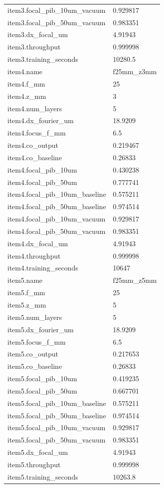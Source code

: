 \begin{longtable}{p{}p{}}
item3.focal\_pib\_10um\_vacuum & 0.929817\\
item3.focal\_pib\_50um\_vacuum & 0.983351\\
item3.dx\_focal\_um & 4.91943\\
item3.throughput & 0.999998\\
item3.training\_seconds & 10280.5\\
item4.name & f25mm\_z3mm\\
item4.f\_mm & 25\\
item4.z\_mm & 3\\
item4.num\_layers & 5\\
item4.dx\_fourier\_um & 18.9209\\
item4.focus\_f\_mm & 6.5\\
item4.co\_output & 0.219467\\
item4.co\_baseline & 0.26833\\
item4.focal\_pib\_10um & 0.430238\\
item4.focal\_pib\_50um & 0.777741\\
item4.focal\_pib\_10um\_baseline & 0.575211\\
item4.focal\_pib\_50um\_baseline & 0.974514\\
item4.focal\_pib\_10um\_vacuum & 0.929817\\
item4.focal\_pib\_50um\_vacuum & 0.983351\\
item4.dx\_focal\_um & 4.91943\\
item4.throughput & 0.999998\\
item4.training\_seconds & 10647\\
item5.name & f25mm\_z5mm\\
item5.f\_mm & 25\\
item5.z\_mm & 5\\
item5.num\_layers & 5\\
item5.dx\_fourier\_um & 18.9209\\
item5.focus\_f\_mm & 6.5\\
item5.co\_output & 0.217653\\
item5.co\_baseline & 0.26833\\
item5.focal\_pib\_10um & 0.419235\\
item5.focal\_pib\_50um & 0.667701\\
item5.focal\_pib\_10um\_baseline & 0.575211\\
item5.focal\_pib\_50um\_baseline & 0.974514\\
item5.focal\_pib\_10um\_vacuum & 0.929817\\
item5.focal\_pib\_50um\_vacuum & 0.983351\\
item5.dx\_focal\_um & 4.91943\\
item5.throughput & 0.999998\\
item5.training\_seconds & 10263.8\\
\end{longtable}

